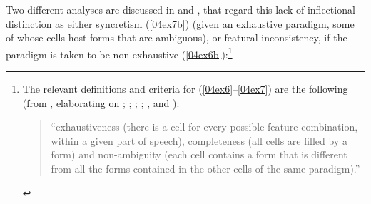 \documentclass[output=paper,colorlinks,citecolor=brown]{langscibook}
\begin{document}
Two different analyses are discussed in \citet{bond2019} and \citet{thornton2019-noncanonical}, that regard this lack of inflectional distinction as either syncretism (\ref{04ex7b}) (given an exhaustive paradigm, some of whose cells host forms that are ambiguous), or featural inconsistency, if the paradigm is taken to be non-exhaustive (\ref{04ex6b}):\footnote{\label{04ftn2}The relevant definitions and criteria for (\ref{04ex6}--\ref{04ex7}) are the following (from \citealt[91]{thornton2019-noncanonical}, elaborating on \citealt[33]{corbett2005}; \citealt[9]{corbett2007};  \citealt[157]{corbett2015}; \citealt[252]{spencer2003}; \citealt[255]{stump2012}, and \citealt[413--414]{bond2019}):
	
\begin{quote}
	``exhaustiveness (there is a cell for every possible feature combination, within a given part of speech), completeness (all cells are filled by a form) and non-ambiguity (each cell contains a form that is different from all the forms contained in the other cells of the same paradigm).''
\end{quote}
}

\bigskip
\end{document}
